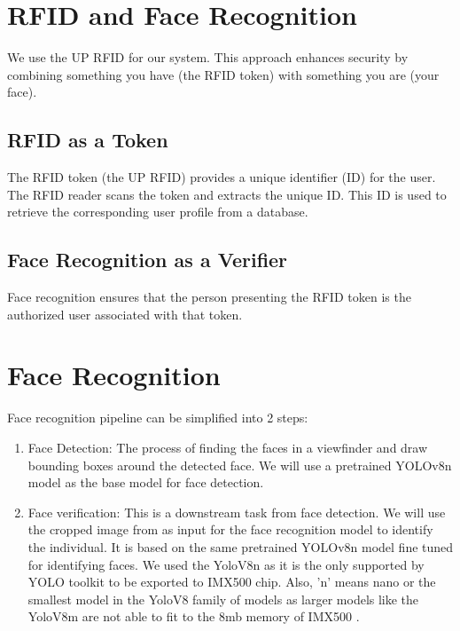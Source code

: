 \section{RFID and Face Recognition}
 We use the UP RFID for our system. This approach enhances security by combining something you have (the RFID token) with something you are (your face).
 \subsection{RFID as a Token}
 The RFID token (the UP RFID) provides a unique identifier (ID) for the user. The RFID reader scans the token and extracts the unique ID. This ID is used to retrieve the corresponding user profile from a database.
 \subsection{Face Recognition as a Verifier}
  Face recognition ensures that the person presenting the RFID token is the authorized user associated with that token.
 	
\section{Face Recognition}
Face recognition pipeline can be simplified into 2 steps:
\begin{enumerate}
	\item Face Detection: The process of finding the faces in a viewfinder and draw bounding boxes around the detected face. We will use a pretrained YOLOv8n model
	as the base model for face detection.
	
	\item Face verification: This is a downstream task from face detection. We will use the cropped image from as input for the face recognition model to identify the individual. It is based on the same pretrained YOLOv8n model fine tuned for identifying faces. We used the YoloV8n as it is the only supported by YOLO toolkit to be exported to IMX500 chip. Also, 'n' means nano or the smallest model in the YoloV8 family of models as larger models like the YoloV8m are not able to fit to the 8mb memory of IMX500 \cite{sony_imx500}.
\end{enumerate}
